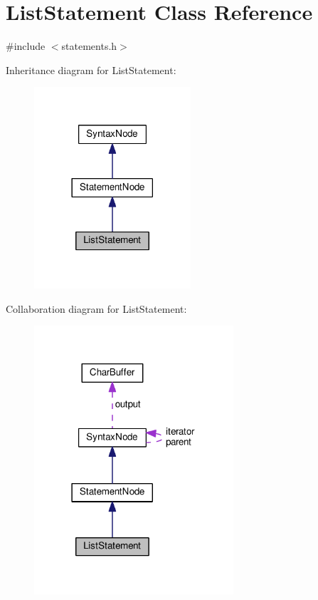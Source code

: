 \hypertarget{classListStatement}{}\section{List\+Statement Class Reference}
\label{classListStatement}


{\ttfamily \#include $<$statements.\+h$>$}



Inheritance diagram for List\+Statement\+:
\nopagebreak
\begin{figure}[H]
\begin{center}
\leavevmode
\includegraphics[width=165pt]{d3/d4c/classListStatement__inherit__graph}
\end{center}
\end{figure}


Collaboration diagram for List\+Statement\+:
\nopagebreak
\begin{figure}[H]
\begin{center}
\leavevmode
\includegraphics[width=210pt]{dc/d02/classListStatement__coll__graph}
\end{center}
\end{figure}
